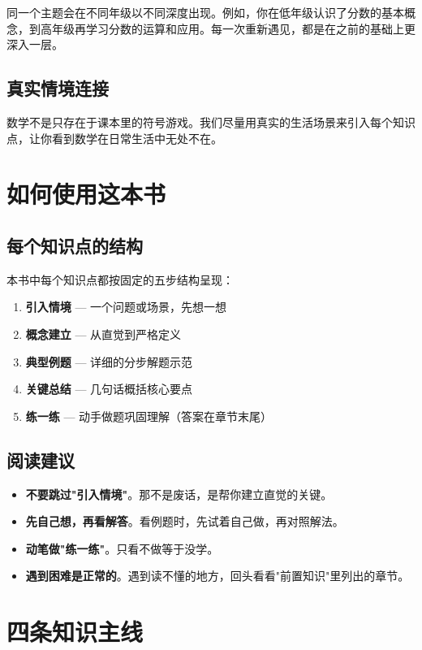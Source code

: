 同一个主题会在不同年级以不同深度出现。例如，你在低年级认识了分数的基本概念，到高年级再学习分数的运算和应用。每一次重新遇见，都是在之前的基础上更深入一层。

\subsection*{真实情境连接}


数学不是只存在于课本里的符号游戏。我们尽量用真实的生活场景来引入每个知识点，让你看到数学在日常生活中无处不在。

\section*{如何使用这本书}


\subsection*{每个知识点的结构}


本书中每个知识点都按固定的五步结构呈现：

\begin{enumerate}
  \item \textbf{引入情境} — 一个问题或场景，先想一想
  \item \textbf{概念建立} — 从直觉到严格定义
  \item \textbf{典型例题} — 详细的分步解题示范
  \item \textbf{关键总结} — 几句话概括核心要点
  \item \textbf{练一练} — 动手做题巩固理解（答案在章节末尾）
\end{enumerate}


\subsection*{阅读建议}


\begin{itemize}
  \item \textbf{不要跳过"引入情境"}。那不是废话，是帮你建立直觉的关键。
  \item \textbf{先自己想，再看解答}。看例题时，先试着自己做，再对照解法。
  \item \textbf{动笔做"练一练"}。只看不做等于没学。
  \item \textbf{遇到困难是正常的}。遇到读不懂的地方，回头看看"前置知识"里列出的章节。
\end{itemize}


\section*{四条知识主线}


